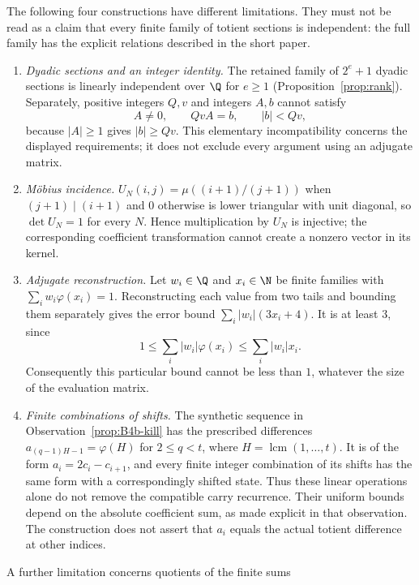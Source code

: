 \begin{prop}
\label{prop:b6}
The following four constructions have different limitations. They must
not be read as a claim that every finite family of totient sections is
independent: the full family has the explicit relations described in the
short paper.
\begin{enumerate}[label=(\roman*),leftmargin=*]
\item \emph{Dyadic sections and an integer identity.} The retained
  family of $2^e+1$ dyadic sections is linearly independent over $\Q$
  for $e\ge1$ (Proposition~\ref{prop:rank}). Separately, positive integers
  $Q,v$ and integers $A,b$ cannot satisfy
  \[
     A\ne0,\qquad QvA=b,\qquad |b|<Qv,
  \]
  because $|A|\ge1$ gives $|b|\ge Qv$.
  This elementary incompatibility concerns the displayed requirements;
  it does not exclude every argument using an adjugate matrix.
\item \emph{M\"obius incidence.} $U_N(i,j) = \mu((i{+}1)/(j{+}1))$ when
  $(j{+}1) \mid (i{+}1)$ and $0$ otherwise is lower triangular with unit
  diagonal, so $\det U_N = 1$ for every $N$. Hence multiplication by
  $U_N$ is injective; the corresponding coefficient transformation cannot
  create a nonzero vector in its kernel.
\item \emph{Adjugate reconstruction.} Let $w_i\in\Q$ and
  $x_i\in\N$ be finite families with $\sum_i w_i\varphi(x_i)=1$.
  Reconstructing each value from two tails and bounding them separately
  gives the error bound $\sum_i|w_i|(3x_i+4)$. It is at least $3$, since
  \[
   1\le\sum_i|w_i|\varphi(x_i)\le\sum_i|w_i|x_i.
  \]
  Consequently this particular bound cannot be less than $1$, whatever
  the size of the evaluation matrix.
\item \emph{Finite combinations of shifts.} The synthetic sequence in
  Observation~\ref{prop:B4b-kill} has the prescribed differences
  $a_{(q-1)H-1}=\varphi(H)$ for $2\le q<t$, where
  $H=\operatorname{lcm}(1,\ldots,t)$. It is of the form
  $a_i=2c_i-c_{i+1}$, and every finite integer combination of its shifts
  has the same form with a correspondingly shifted state. Thus these
  linear operations alone do not remove the compatible carry recurrence.
  Their uniform bounds depend on the absolute coefficient sum, as made
  explicit in that observation. The construction does not assert that
  $a_i$ equals the actual totient difference at other indices.
\end{enumerate}
A further limitation concerns quotients of the finite sums

\end{prop}
